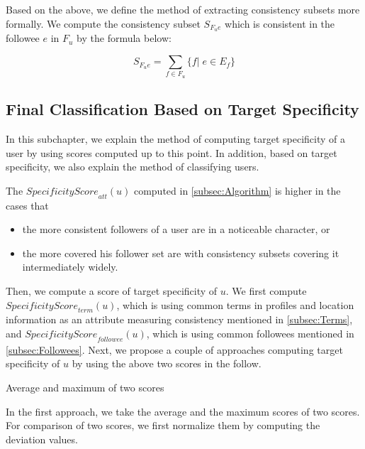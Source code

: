 Based on the above, we define the method of extracting consistency
subsets more formally.  We compute the consistency subset $S_{F_ue}$
which is consistent in the followee $e$ in $F_u$ by the formula below:

\vspace{-1ex}
\[
 S_{F_ue} =  \sum_{f \in F_u} \{f|\;e \in E_f \}
\]
\vspace{-2ex}


\subsection{Final Classification Based on Target Specificity}
\label{subsubsec:Final Classification}

In this subchapter, we explain the method of computing target
specificity of a user by using scores computed up to this
point.  In addition, based on target specificity, we also explain the
method of classifying users.

The $\mathit{SpecificityScore}_{{\mathit{att}}}(u)$ computed in
\ref{subsec:Algorithm} is higher in the cases that

\begin{itemize}
\item the more consistent followers of a user are in a noticeable
      character, or
\item the more covered his follower set are with consistency
      subsets covering it intermediately widely.
\end{itemize}

Then, we compute a score of target specificity of $u$. We first
compute $\mathit{SpecificityScore}_{{\mathit{term}}}(u)$, which is using
common terms in profiles and location information as an attribute
measuring consistency mentioned in \ref{subsec:Terms}, and
$\mathit{SpecificityScore}_{{\mathit{followee}}}(u)$, which is using
common followees mentioned in \ref{subsec:Followees}.  Next, we propose
a couple of approaches computing target specificity of $u$ by using the
above two scores in the follow.

\begin{description}
\bf{\item[(1)] Average and maximum of two scores}
\label{item:Avg and Max}
\end{description}

In the first approach, we take the average and the maximum scores of two
scores.  For comparison of two scores, we first normalize them by
computing the deviation values.

